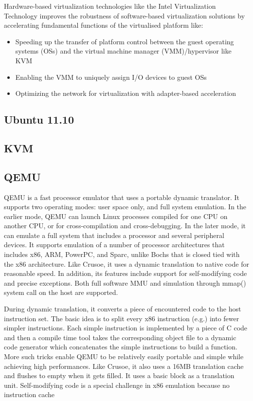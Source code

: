 \documentclass[12pt,a4paper]{report}
\begin{document}
Hardware-based virtualization technologies like the Intel Virtualization Technology
improves the robustness of software-based virtualization solutions by accelerating
fundamental functions of the virtualised platform like:\cite{neiger2006intel}

\begin{itemize}
 \item Speeding up the transfer of platform control between the guest operating systems (OSs) and the virtual machine manager (VMM)/hypervisor like KVM
 \item Enabling the VMM to uniquely assign I/O devices to guest OSs
 \item Optimizing the network for virtualization with adapter-based acceleration
\end{itemize}





\subsection{Ubuntu 11.10}
\subsection{KVM}
\subsection{QEMU}

QEMU is a fast processor emulator that uses a portable dynamic translator. It supports two operating
modes: user space only, and full system emulation. In the earlier mode, QEMU can launch Linux processes
compiled for one CPU on another CPU, or for cross-compilation and cross-debugging. In the later mode, it
can emulate a full system that includes a processor and several peripheral devices. It supports emulation of a
number of processor architectures that includes x86, ARM, PowerPC, and Sparc, unlike Bochs that is closed
tied with the x86 architecture. Like Crusoe, it uses a dynamic translation to native code for reasonable speed.
In addition, its features include support for self-modifying code and precise exceptions. Both full software
MMU and simulation through mmap() system call on the host are supported. \cite{chiueh2005survey}

During dynamic translation, it converts a piece of encountered code to the host instruction set. The
basic idea is to split every x86 instruction (e.g.) into fewer simpler instructions. Each simple instruction
is implemented by a piece of C code and then a compile time tool takes the corresponding object ﬁle to a
dynamic code generator which concatenates the simple instructions to build a function. More such tricks
enable QEMU to be relatively easily portable and simple while achieving high performances. Like Crusoe,
it also uses a 16MB translation cache and ﬂushes to empty when it gets ﬁlled. It uses a basic block as a
translation unit. Self-modifying code is a special challenge in x86 emulation because no instruction cache
\end{document}
